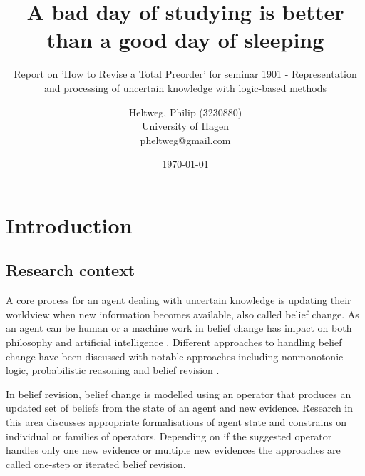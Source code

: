\documentclass[11pt]{scrartcl}
\theoremstyle{definition}
\theoremstyle{definition}
\begin{document}
\title{A bad day of studying is better than a good day of sleeping}
\subtitle{Report on 'How to Revise a Total Preorder' \cite{Booth2011} for seminar 1901 - Representation and processing of uncertain knowledge with logic-based methods}
\author{
	Heltweg, Philip (3230880) \\
	University of Hagen \\
	pheltweg@gmail.com
}
\date{\today}
\maketitle


\newpage

\tableofcontents

\newpage

\section{Introduction}



\subsection{Research context}
A core process for an agent dealing with uncertain knowledge is updating their worldview when new information becomes available, also called belief change. As an agent can be human or a machine work in belief change has impact on both philosophy and artificial intelligence \cite{Ferme2011}. Different approaches to handling belief change have been discussed with notable approaches including nonmonotonic logic, probabilistic reasoning and belief revision \cite{Darwiche1997}.

In belief revision, belief change is modelled using an operator that produces an updated set of beliefs from the state of an agent and new evidence. Research in this area discusses appropriate formalisations of agent state and constrains on individual or families of operators. Depending on if the suggested operator handles only one new evidence or multiple new evidences the approaches are called one-step or iterated belief revision.
\end{document}
